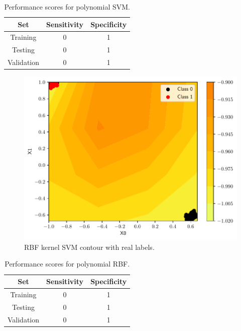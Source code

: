 \documentclass[conference]{IEEEtran}
\theoremstyle{definition}
\theoremstyle{remark}
\theoremstyle{remark}
\begin{document}
\begin{table}[H]
  \centering
  \caption{Performance scores for polynomial SVM.}
  \label{tab:poly_SVM_emb}
  \begin{tabular}{ccc}
    \hline
    \textbf{Set} & \textbf{Sensitivity} & \textbf{Specificity} \\ \hline
    Training & 0 & 1 \\
    Testing & 0 & 1 \\
    Validation & 0 & 1 \\ \hline
  \end{tabular}
\end{table}

\begin{figure}
  \includegraphics[width=\columnwidth]{figs/svm-emb-rbf-contour-0-1.pdf}
  \caption{RBF kernel SVM contour with real labels.}
\end{figure}

\begin{table}[H]
  \centering
  \caption{Performance scores for polynomial RBF.}
  \label{tab:rbf_SVM_emb}
  \begin{tabular}{ccc}
    \hline
    \textbf{Set} & \textbf{Sensitivity} & \textbf{Specificity} \\ \hline
    Training & 0 & 1 \\
    Testing & 0 & 1 \\
    Validation & 0 & 1 \\ \hline
  \end{tabular}
\end{table}
\end{document}
